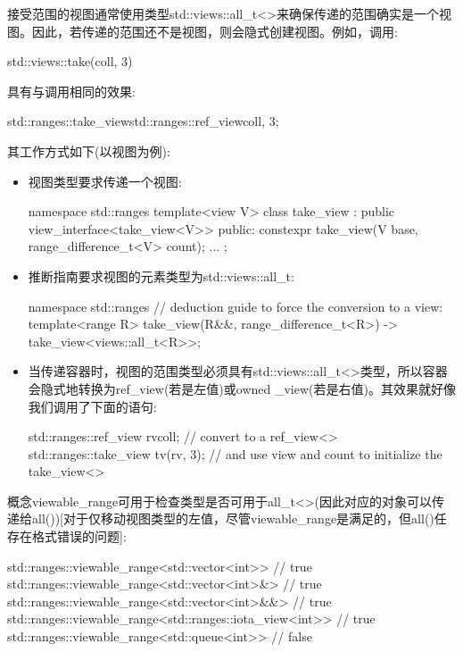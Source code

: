 接受范围的视图通常使用类型std::views::all\_t<>来确保传递的范围确实是一个视图。因此，若传递的范围还不是视图，则会隐式创建视图。例如，调用:

\begin{cpp}
std::views::take(coll, 3)
\end{cpp}

具有与调用相同的效果:

\begin{cpp}
std::ranges::take_view{std::ranges::ref_view{coll}, 3};
\end{cpp}

其工作方式如下(以视图为例):

\begin{itemize}
\item
视图类型要求传递一个视图:

\begin{cpp}
namespace std::ranges {
	template<view V>
	class take_view : public view_interface<take_view<V>> {
		public:
		constexpr take_view(V base, range_difference_t<V> count);
		...
	};
}
\end{cpp}

\item
推断指南要求视图的元素类型为std::views::all\_t:

\begin{cpp}
namespace std::ranges {
	// deduction guide to force the conversion to a view:
	template<range R>
	take_view(R&&, range_difference_t<R>) -> take_view<views::all_t<R>>;
}
\end{cpp}

\item
当传递容器时，视图的范围类型必须具有std::views::all\_t<>类型，所以容器会隐式地转换为ref\_view(若是左值)或owned \_view(若是右值)。其效果就好像我们调用了下面的语句:

\begin{cpp}
std::ranges::ref_view rv{coll}; // convert to a ref_view<>
std::ranges::take_view tv(rv, 3); // and use view and count to initialize the take_view<>
\end{cpp}
\end{itemize}

概念viewable\_range可用于检查类型是否可用于all\_t<>(因此对应的对象可以传递给all())[对于仅移动视图类型的左值，尽管viewable\_range是满足的，但all()任存在格式错误的问题]:

\begin{cpp}
std::ranges::viewable_range<std::vector<int>> // true
std::ranges::viewable_range<std::vector<int>&> // true
std::ranges::viewable_range<std::vector<int>&&> // true
std::ranges::viewable_range<std::ranges::iota_view<int>> // true
std::ranges::viewable_range<std::queue<int>> // false
\end{cpp}

